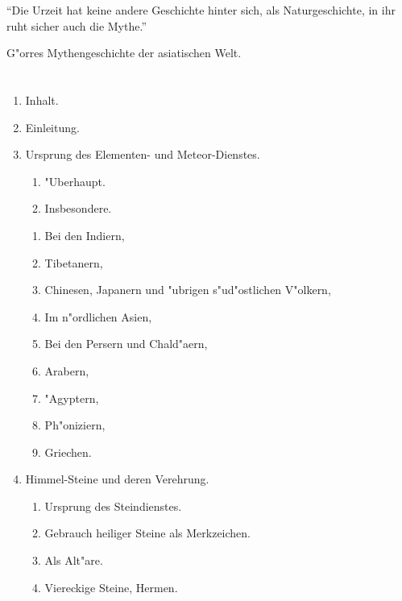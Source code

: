 \documentclass[a4paper, 11pt, oneside, polutonikogreek, german]{article}
\begin{document}
\setlength{\parskip}{1mm plus1mm minus1mm}
\clearpage
\LARGE
\pagestyle{fancy}
\fancyhf{}
\cfoot{\swabfamily{\thepage}}
\vspace*{\fill}
\begin{center}
"`Die Urzeit hat keine andere Geschichte hinter sich, als Naturgeschichte, in ihr ruht sicher auch die Mythe."'
\end{center}
\begin{center}
G"orres Mythengeschichte der asiatischen Welt.
\end{center}
\vspace*{\fill}
\clearpage
\section*{\Huge{}}
\begin{enumerate}
    \item[] Inhalt.
    \item[] Einleitung.
    \item Ursprung des Elementen- und Meteor-Dienstes.
    \begin{enumerate}
        \item "Uberhaupt.
        \item Insbesondere.
    \end{enumerate}
    \begin{enumerate}
        \item Bei den Indiern,
        \item Tibetanern,
        \item Chinesen, Japanern und "ubrigen s"ud"ostlichen V"olkern,
        \item Im n"ordlichen Asien,
        \item Bei den Persern und Chald"aern,
        \item Arabern,
        \item "Agyptern,
        \item Ph"oniziern,
        \item Griechen.
    \end{enumerate}
    \item Himmel-Steine und deren Verehrung.
    \begin{enumerate}
        \item Ursprung des Steindienstes.
        \item Gebrauch heiliger Steine als Merkzeichen.
        \item Als Alt"are.
        \item Viereckige Steine, Hermen.

\end{enumerate}
\end{enumerate}
\end{document}

